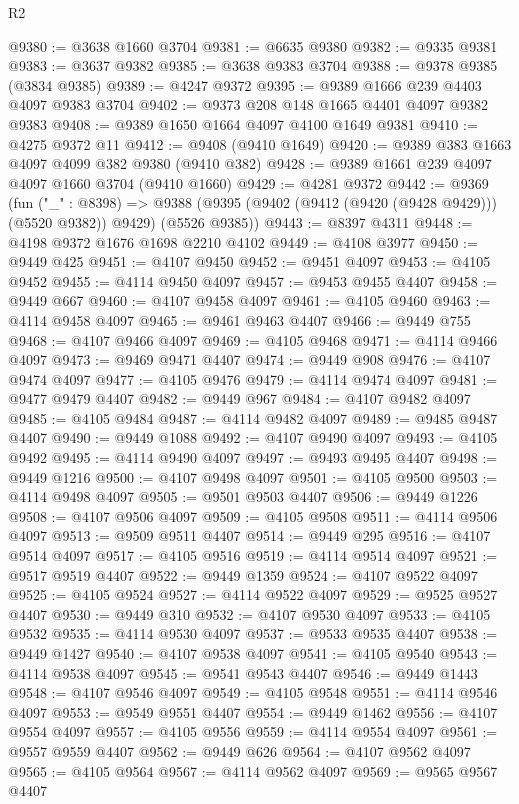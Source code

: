 \begin{lexlean}{R2}
\begin{coremodule}
@9380 := @3638 @1660 @3704
@9381 := @6635 @9380
@9382 := @9335 @9381
@9383 := @3637 @9382
@9385 := @3638 @9383 @3704
@9388 := @9378 @9385 (@3834 @9385)
@9389 := @4247 @9372
@9395 := @9389 @1666 @239 @4403 @4097 @9383 @3704
@9402 := @9373 @208 @148 @1665 @4401 @4097 @9382 @9383
@9408 := @9389 @1650 @1664 @4097 @4100 @1649 @9381
@9410 := @4275 @9372 @11
@9412 := @9408 (@9410 @1649)
@9420 := @9389 @383 @1663 @4097 @4099 @382 @9380 (@9410 @382)
@9428 := @9389 @1661 @239 @4097 @4097 @1660 @3704 (@9410 @1660)
@9429 := @4281 @9372
@9442 := @9369
    (fun ("_" : @8398) =>
    @9388 (@9395 (@9402 (@9412 (@9420 (@9428 @9429))) (@5520 @9382)) @9429) (@5526 @9385))
@9443 := @8397 @4311
@9448 := @4198 @9372 @1676 @1698 @2210 @4102
@9449 := @4108 @3977
@9450 := @9449 @425
@9451 := @4107 @9450
@9452 := @9451 @4097
@9453 := @4105 @9452
@9455 := @4114 @9450 @4097
@9457 := @9453 @9455 @4407
@9458 := @9449 @667
@9460 := @4107 @9458 @4097
@9461 := @4105 @9460
@9463 := @4114 @9458 @4097
@9465 := @9461 @9463 @4407
@9466 := @9449 @755
@9468 := @4107 @9466 @4097
@9469 := @4105 @9468
@9471 := @4114 @9466 @4097
@9473 := @9469 @9471 @4407
@9474 := @9449 @908
@9476 := @4107 @9474 @4097
@9477 := @4105 @9476
@9479 := @4114 @9474 @4097
@9481 := @9477 @9479 @4407
@9482 := @9449 @967
@9484 := @4107 @9482 @4097
@9485 := @4105 @9484
@9487 := @4114 @9482 @4097
@9489 := @9485 @9487 @4407
@9490 := @9449 @1088
@9492 := @4107 @9490 @4097
@9493 := @4105 @9492
@9495 := @4114 @9490 @4097
@9497 := @9493 @9495 @4407
@9498 := @9449 @1216
@9500 := @4107 @9498 @4097
@9501 := @4105 @9500
@9503 := @4114 @9498 @4097
@9505 := @9501 @9503 @4407
@9506 := @9449 @1226
@9508 := @4107 @9506 @4097
@9509 := @4105 @9508
@9511 := @4114 @9506 @4097
@9513 := @9509 @9511 @4407
@9514 := @9449 @295
@9516 := @4107 @9514 @4097
@9517 := @4105 @9516
@9519 := @4114 @9514 @4097
@9521 := @9517 @9519 @4407
@9522 := @9449 @1359
@9524 := @4107 @9522 @4097
@9525 := @4105 @9524
@9527 := @4114 @9522 @4097
@9529 := @9525 @9527 @4407
@9530 := @9449 @310
@9532 := @4107 @9530 @4097
@9533 := @4105 @9532
@9535 := @4114 @9530 @4097
@9537 := @9533 @9535 @4407
@9538 := @9449 @1427
@9540 := @4107 @9538 @4097
@9541 := @4105 @9540
@9543 := @4114 @9538 @4097
@9545 := @9541 @9543 @4407
@9546 := @9449 @1443
@9548 := @4107 @9546 @4097
@9549 := @4105 @9548
@9551 := @4114 @9546 @4097
@9553 := @9549 @9551 @4407
@9554 := @9449 @1462
@9556 := @4107 @9554 @4097
@9557 := @4105 @9556
@9559 := @4114 @9554 @4097
@9561 := @9557 @9559 @4407
@9562 := @9449 @626
@9564 := @4107 @9562 @4097
@9565 := @4105 @9564
@9567 := @4114 @9562 @4097
@9569 := @9565 @9567 @4407

\end{coremodule}
\end{lexlean}
